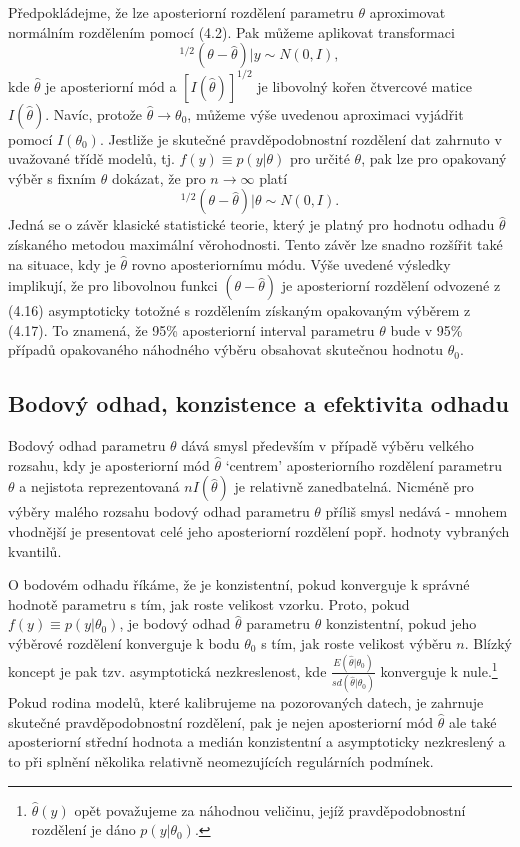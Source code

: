 Předpokládejme, že lze aposteriorní rozdělení parametru $\theta$ aproximovat normálním rozdělením pomocí (4.2). Pak můžeme aplikovat transformaci
\begin{equation}
[I(\hat{\theta})]^{1/2}(\theta - \hat{\theta})|y \sim N(0, I),
\end{equation}
kde $\hat{\theta}$ je aposteriorní mód a $[I(\hat{\theta})]^{1/2}$ je libovolný kořen čtvercové matice $I(\hat{\theta})$. Navíc, protože $\hat{\theta} \rightarrow \theta_0$, můžeme výše uvedenou aproximaci vyjádřit pomocí $I(\theta_0)$. Jestliže je skutečné pravděpodobnostní rozdělení dat zahrnuto v uvažované třídě modelů, tj. $f(y) \equiv p(y|\theta)$ pro určité $\theta$, pak lze pro opakovaný výběr s fixním $\theta$ dokázat, že pro $n \rightarrow \infty$ platí
\begin{equation}
[I(\hat{I})]^{1/2}(\theta - \hat{\theta}) | \theta \sim N(0, I).
\end{equation}
Jedná se o závěr klasické statistické teorie, který je platný pro hodnotu odhadu $\hat{\theta}$ získaného metodou maximální věrohodnosti. Tento závěr lze snadno rozšířit také na situace, kdy je $\hat{\theta}$ rovno aposteriornímu módu. Výše uvedené výsledky implikují, že pro libovolnou funkci $(\theta - \hat{\theta})$ je aposteriorní rozdělení odvozené z (4.16) asymptoticky totožné s rozdělením získaným opakovaným výběrem z (4.17). To znamená, že 95\% aposteriorní interval parametru $\theta$ bude v 95\% případů opakovaného náhodného výběru obsahovat skutečnou hodnotu $\theta_0$.

\subsection{Bodový odhad, konzistence a efektivita odhadu}

Bodový odhad parametru $\theta$ dává smysl především v případě výběru velkého rozsahu, kdy je aposteriorní mód $\hat{\theta}$ `centrem' aposteriorního rozdělení parametru $\theta$ a nejistota reprezentovaná $nI(\hat{\theta})$ je relativně zanedbatelná. Nicméně pro výběry malého rozsahu bodový odhad parametru $\theta$ příliš smysl nedává - mnohem vhodnější je presentovat celé jeho aposteriorní rozdělení popř. hodnoty vybraných kvantilů.

O bodovém odhadu říkáme, že je konzistentní, pokud konverguje k správné hodnotě parametru s tím, jak roste velikost vzorku. Proto, pokud $f(y) \equiv p(y|\theta_0)$, je bodový odhad $\hat{\theta}$ parametru $\theta$ konzistentní, pokud jeho výběrové rozdělení konverguje k bodu $\theta_0$ s tím, jak roste velikost výběru $n$. Blízký koncept je pak tzv. asymptotická nezkreslenost, kde $\frac{E(\hat{\theta}|\theta_0)}{sd(\hat{\theta}|\theta_0)}$ konverguje k nule.\footnote{$\hat{\theta}(y)$ opět považujeme za náhodnou veličinu, jejíž pravděpodobnostní rozdělení je dáno $p(y|\theta_0)$.} Pokud rodina modelů, které kalibrujeme na pozorovaných datech, je zahrnuje skutečné pravděpodobnostní rozdělení, pak je nejen aposteriorní mód $\hat{\theta}$ ale také aposteriorní střední hodnota a medián konzistentní a asymptoticky nezkreslený a to při splnění několika relativně neomezujících regulárních podmínek.

